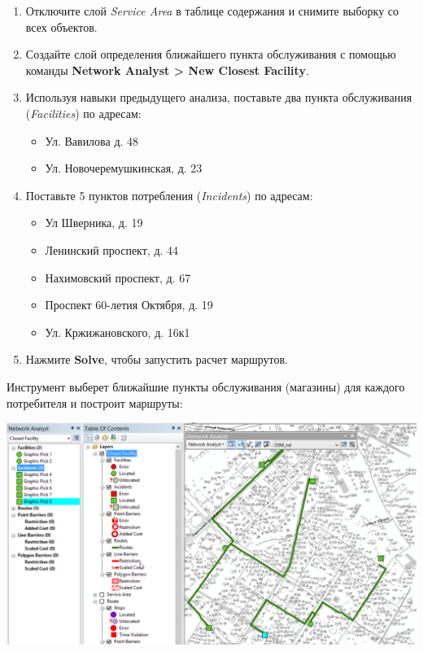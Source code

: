 \documentclass[]{book}
\providecommand{\tightlist}{%
  \setlength{\itemsep}{0pt}\setlength{\parskip}{0pt}}
\theoremstyle{definition}
\theoremstyle{definition}
\theoremstyle{definition}
\theoremstyle{remark}
\begin{document}
\begin{enumerate}
\def\labelenumi{\arabic{enumi}.}
\item
  Отключите слой \emph{Service Area} в таблице содержания и снимите
  выборку со всех объектов.
\item
  Создайте слой определения ближайшего пункта обслуживания с помощью
  команды \textbf{Network Analyst \textgreater{} New Closest Facility}.
\item
  Используя навыки предыдущего анализа, поставьте два пункта
  обслуживания (\emph{Facilities}) по адресам:

  \begin{itemize}
  \tightlist
  \item
    Ул. Вавилова д. 48
  \item
    Ул. Новочеремушкинская, д. 23
  \end{itemize}
\item
  Поставьте 5 пунктов потребления (\emph{Incidents}) по адресам:

  \begin{itemize}
  \item
    Ул Шверника, д. 19
  \item
    Ленинский проспект, д. 44
  \item
    Нахимовский проспект, д. 67
  \item
    Проспект 60-летия Октября, д. 19
  \item
    Ул. Кржижановского, д. 16к1
  \end{itemize}
\item
  Нажмите \textbf{Solve}, чтобы запустить расчет маршрутов.
\end{enumerate}

Инструмент выберет ближайшие пункты обслуживания (магазины) для каждого
потребителя и построит маршруты:

\includegraphics{images/Ex12/image20.png}
\end{document}

